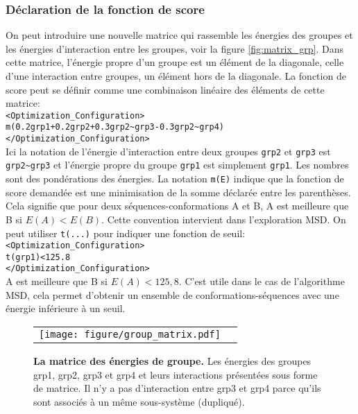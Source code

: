 \subsubsection{Déclaration de la fonction de score}
\label{sub:score}
On peut introduire une nouvelle matrice qui rassemble les énergies des groupes et les énergies d'interaction entre les groupes, voir la figure \ref{fig:matrix_grp}. Dans cette matrice, l'énergie propre d'un groupe est un élément de la diagonale, celle d'une interaction entre groupes, un élément hors de la diagonale. La fonction de score peut se définir comme une combinaison linéaire des éléments de cette matrice:\\
\verb!<Optimization_Configuration>! \\
\verb!m(0.2grp1+0.2grp2+0.3grp2~grp3-0.3grp2~grp4)! \\
\verb!</Optimization_Configuration>! \\
Ici la notation de l'énergie d'interaction entre deux groupes \verb!grp2! et \verb!grp3! est \verb!grp2~grp3! et l'énergie propre du groupe \verb!grp1! est simplement \verb!grp1!. Les nombres sont des pondérations des énergies. La notation \verb!m(E)! indique que la fonction de score demandée est une minimisation de la somme déclarée entre les parenthèses. Cela signifie que pour deux séquences-conformations A et B, A est meilleure que B si $E(A) < E(B)$. Cette convention intervient dans l'exploration MSD. On peut utiliser \verb!t(...)! pour indiquer une fonction de seuil:\\
\verb!<Optimization_Configuration>! \\
\verb!t(grp1)<125.8! \\
\verb!</Optimization_Configuration>! \\
A est meilleure que B si $E(A)<125,8$. C'est utile dans le cas de l'algorithme MSD, cela permet d'obtenir un ensemble de conformations-séquences avec une énergie inférieure à un seuil.
\begin{figure}[!htbp]
  \centering
  \begin{tabular}{cc}
    \texttt{[image: figure/group\_matrix.pdf]} &
  \end{tabular}
  
  \caption{\textbf{La matrice des énergies de groupe.} Les énergies des groupes grp1, grp2, grp3 et grp4 et leurs interactions présentées sous forme de matrice. Il n'y a pas d'interaction entre grp3 et grp4 parce qu'ils sont associés à un même sous-système (dupliqué).}
  \label{fig:groupmatrix}
\end{figure}



